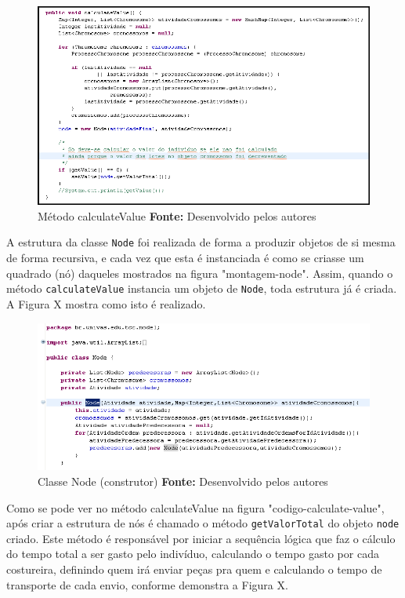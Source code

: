 \newpage

\begin{figure}[h!]
	\centerline{\includegraphics[scale=0.7]{./imagens/codigo_calculate_value.png}}
	\caption[Distribuição de trabalho]
	{Método calculateValue \textbf{Fonte:} Desenvolvido pelos autores}
	\label{fig:exemplo1}
\end{figure}

\par A estrutura da classe \texttt{Node} foi realizada de forma a produzir objetos de si mesma de forma recursiva, e cada
vez que esta é instanciada é como se criasse um quadrado (nó) daqueles mostrados na figura "montagem-node". Assim, quando 
o método \texttt{calculateValue} instancia um objeto de \texttt{Node}, toda estrutura já é criada. A Figura X mostra como isto
é realizado. 

\begin{figure}[h!]
	\centerline{\includegraphics[scale=0.8]{./imagens/node_class.png}}
	\caption[Distribuição de trabalho]
	{Classe Node (construtor) \textbf{Fonte:} Desenvolvido pelos autores}
	\label{fig:exemplo1}
\end{figure}


\par Como se pode ver no método calculateValue na figura "codigo-calculate-value", após criar a estrutura de nós é chamado 
o método \texttt{getValorTotal} do objeto \texttt{node} criado. Este método é responsável por iniciar a sequência lógica que
faz o cálculo do tempo total a ser gasto pelo indivíduo, calculando o tempo gasto por cada costureira, definindo quem irá enviar
peças pra quem e calculando o tempo de transporte de cada envio, conforme demonstra a Figura X.

